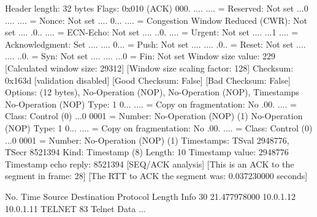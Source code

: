     Header length: 32 bytes
    Flags: 0x010 (ACK)
        000. .... .... = Reserved: Not set
        ...0 .... .... = Nonce: Not set
        .... 0... .... = Congestion Window Reduced (CWR): Not set
        .... .0.. .... = ECN-Echo: Not set
        .... ..0. .... = Urgent: Not set
        .... ...1 .... = Acknowledgment: Set
        .... .... 0... = Push: Not set
        .... .... .0.. = Reset: Not set
        .... .... ..0. = Syn: Not set
        .... .... ...0 = Fin: Not set
    Window size value: 229
    [Calculated window size: 29312]
    [Window size scaling factor: 128]
    Checksum: 0x163d [validation disabled]
        [Good Checksum: False]
        [Bad Checksum: False]
    Options: (12 bytes), No-Operation (NOP), No-Operation (NOP), Timestamps
        No-Operation (NOP)
            Type: 1
                0... .... = Copy on fragmentation: No
                .00. .... = Class: Control (0)
                ...0 0001 = Number: No-Operation (NOP) (1)
        No-Operation (NOP)
            Type: 1
                0... .... = Copy on fragmentation: No
                .00. .... = Class: Control (0)
                ...0 0001 = Number: No-Operation (NOP) (1)
        Timestamps: TSval 2948776, TSecr 8521394
            Kind: Timestamp (8)
            Length: 10
            Timestamp value: 2948776
            Timestamp echo reply: 8521394
    [SEQ/ACK analysis]
        [This is an ACK to the segment in frame: 28]
        [The RTT to ACK the segment was: 0.037230000 seconds]

No.     Time           Source                Destination           Protocol Length Info
     30 21.477978000   10.0.1.12             10.0.1.11             TELNET   83     Telnet Data ...

